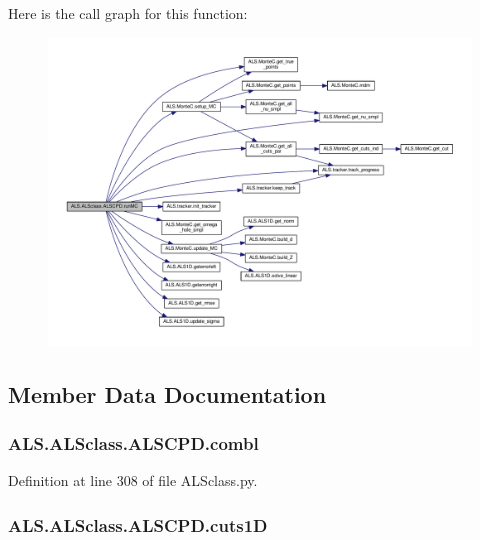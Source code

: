 Here is the call graph for this function\+:
\nopagebreak
\begin{figure}[H]
\begin{center}
\leavevmode
\includegraphics[width=350pt]{class_a_l_s_1_1_a_l_sclass_1_1_a_l_s_c_p_d_af20a0e01f143f265f72fcb3d94fd2faf_cgraph}
\end{center}
\end{figure}




\subsection{Member Data Documentation}
\hypertarget{class_a_l_s_1_1_a_l_sclass_1_1_a_l_s_c_p_d_a03d7f0dc0293cf32543f53a3eeb04333}{
\subsubsection[{combl}]{\setlength{\rightskip}{0pt plus 5cm}A\+L\+S.\+A\+L\+Sclass.\+A\+L\+S\+C\+P\+D.\+combl}}\label{class_a_l_s_1_1_a_l_sclass_1_1_a_l_s_c_p_d_a03d7f0dc0293cf32543f53a3eeb04333}


Definition at line 308 of file A\+L\+Sclass.\+py.

\hypertarget{class_a_l_s_1_1_a_l_sclass_1_1_a_l_s_c_p_d_ad15383d966830d360c1f465e86670834}{
\subsubsection[{cuts1\+D}]{\setlength{\rightskip}{0pt plus 5cm}A\+L\+S.\+A\+L\+Sclass.\+A\+L\+S\+C\+P\+D.\+cuts1\+D}}\label{class_a_l_s_1_1_a_l_sclass_1_1_a_l_s_c_p_d_ad15383d966830d360c1f465e86670834}



